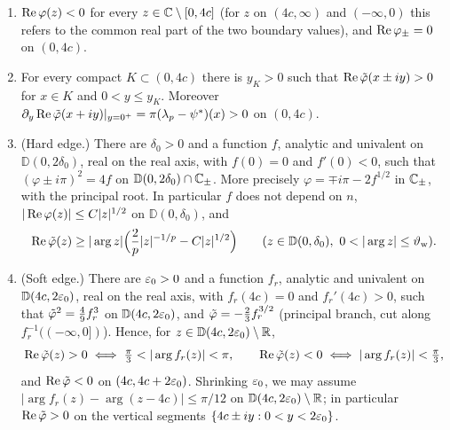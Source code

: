 \begin{lemma}\label{lem:signs}
\begin{enumerate}
\item[(i)] $\operatorname{Re}\varphi(z)<0$ for every $z\in\mathbb{C}\setminus[0,4c]$ (for $z$ on $(4c,\infty)$ and $(-\infty,0)$ this
  refers to the common real part of the two boundary values), and $\operatorname{Re}\varphi_\pm=0$ on $(0,4c)$.
\item[(ii)] For every compact $K\subset(0,4c)$ there is $y_K>0$ such that $\operatorname{Re}\tilde\varphi(x\pm iy)>0$ for $x\in K$ and
  $0<y\le y_K$. Moreover $\partial_y\operatorname{Re}\tilde\varphi(x+iy)|_{y=0^+}=\pi(\lambda_p-\psi^*)(x)>0$ on $(0,4c)$.
\item[(iii)] (Hard edge.) There are $\delta_0>0$ and a function $f$, analytic and univalent on $\mathbb D(0,2\delta_0)$,
  real on the real axis, with $f(0)=0$ and $f'(0)<0$, such that $(\varphi\pm i\pi)^2=4f$ on $\mathbb D(0,2\delta_0)\cap\mathbb{C}_\pm$.
  More precisely $\varphi=\mp i\pi-2f^{1/2}$ in $\mathbb{C}_\pm$, with the principal root. In particular $f$ does not
  depend on $n$, $|\operatorname{Re}\varphi(z)|\le C|z|^{1/2}$ on $\mathbb D(0,\delta_0)$, and
  \begin{equation}\label{eq:retvphi-zero}
    \re\tvphi(z)\ge|\arg z|\Bigl(\frac2p|z|^{-1/p}-C|z|^{1/2}\Bigr)\qquad(z\in \mathbb D(0,\delta_0),\ 0<|\arg z|\le\thw).
  \end{equation}
\item[(iv)] (Soft edge.) There are $\varepsilon_0>0$ and a function $f_r$, analytic and univalent on $\mathbb D(4c,2\varepsilon_0)$, real
  on the real axis, with $f_r(4c)=0$ and $f_r'(4c)>0$, such that $\tilde\varphi^2=\frac49f_r^3$ on $\mathbb D(4c,2\varepsilon_0)$, and
  $\tilde\varphi=-\frac23f_r^{3/2}$ (principal branch, cut along $f_r^{-1}((-\infty,0])$). Hence, for
  $z\in \mathbb D(4c,2\varepsilon_0)\setminus\mathbb{R}$,
  \[
    \re\tvphi(z)>0\iff\tfrac\pi3<|\arg f_r(z)|<\pi,\qquad \re\tvphi(z)<0\iff|\arg f_r(z)|<\tfrac\pi3 ,
  \]
  and $\operatorname{Re}\tilde\varphi<0$ on $(4c,4c+2\varepsilon_0)$. Shrinking $\varepsilon_0$, we may assume $|\arg f_r(z)-\arg(z-4c)|\le\pi/12$ on
  $\mathbb D(4c,2\varepsilon_0)\setminus\mathbb{R}$; in particular $\operatorname{Re}\tilde\varphi>0$ on the vertical segments $\{4c\pm iy:0<y<2\varepsilon_0\}$.
\end{enumerate}
\end{lemma}

